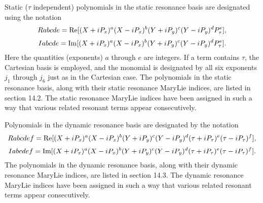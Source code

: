 Static ($\tau$ independent) polynomials in the static resonance basis are
designated using the notation
\[
Rabcde = {\rm Re} [(X + iP_x)^a (X - iP_x)^b (Y + iP_y)^c (Y - iP_y)^d
P^e_{\tau}],
\]
\begin{equation}
Iabcde = {\rm Im} [(X + iP_x)^a (X - iP_x)^b (Y + iP_y)^c (Y - iP_y)^d
P^e_{\tau}] .
\end{equation}
Here the quantities (exponents) $a$ through $e$ are integers.   If a term contains $\tau$, the Cartesian basis is employed, and the
monomial is designated by all six exponents $j_1$ through $j_6$ just as in the
Cartesian case.  The polynomials in the static resonance basis, along
with their static resonance MaryLie indices, are listed in section 14.2.
The static resonance MaryLie indices have been assigned in such a way
that various related resonant terms appear consecutively.

Polynomials in the dynamic resonance basis are designated by the notation
\[
Rabcdef = {\rm Re} [(X + iP_x)^a (X - iP_x)^b (Y + iP_y)^c (Y - iP_y)^d (\tau +
iP_{\tau})^e (\tau - iP_{\tau})^f] ,
\]
\begin{equation}
Iabcdef = {\rm Im} [(X + iP_x)^a (X - iP_x)^b (Y + iP_y)^c (Y - iP_y)^d (\tau +
iP_{\tau})^e (\tau - iP_{\tau})^f] .
\end{equation}
The polynomials in the dynamic resonance basis, along with their dynamic
resonance MaryLie indices, are listed in section 14.3.  The dynamic
resonance MaryLie indices have been assigned in such a way that various
related resonant terms appear consecutively.

\clearpage
